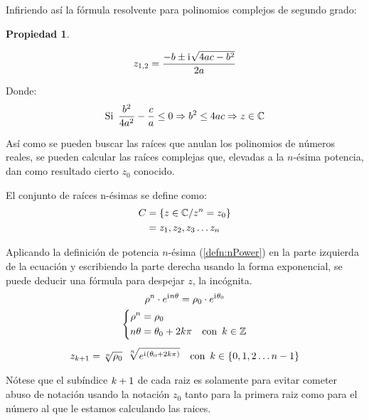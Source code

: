 \documentclass[a5paper,12pt,twoside]{book}
\newtheorem{prop}{{Propiedad}}[chapter]
\begin{document}
Infiriendo así la fórmula resolvente para polinomios complejos de segundo grado:

\begin{mdframed}[style=MyFrame1]
    \begin{prop}
    \end{prop}
    \begin{equation*}
        z_{1,2} = \frac{-b \pm \mathrm{i}\mkern1mu \sqrt{4ac-b^2}}{2a}
    \end{equation*}
\end{mdframed}

Donde:
\begin{equation*}
    \textrm{Si} \enspace \frac{b^2}{4a^2} - \frac{c}{a} \leq 0 \Rightarrow b^2 \leq 4ac \Rightarrow z \in \mathbb{C}
\end{equation*}

Así como se pueden buscar las raíces que anulan los polinomios de números reales, se pueden calcular las raíces complejas que, elevadas a la $n$-ésima potencia, dan como resultado cierto $z_0$ conocido.

El conjunto de raíces n-ésimas se define como:
\begin{align*}
    C &= { \left\{ {z \in \mathbb{C} / z^n=z_0} \right\} }
    \\
    &= z_1,z_2,z_3 \ldots z_n
\end{align*}

Aplicando la definición de potencia $n$-ésima (\ref{defn:nPower}) en la parte izquierda de la ecuación y escribiendo la parte derecha usando la forma exponencial, se puede deducir una fórmula para despejar $z$, la incógnita.
\begin{gather*}
    \rho^n \cdot e^{\mathrm{i}\mkern1mu n \theta} = \rho_0 \cdot e^{\mathrm{i}\mkern1mu \theta_0}
    \\
    \left\{
    \begin{aligned}
        \rho^n &= \rho_0
        \\
        n \theta &= \theta_0 + 2k \pi \quad \textrm{con} \enspace k \in \mathbb{Z}
    \end{aligned}
    \right.
    \\[1ex]
    z_{k+1} = \sqrt[n]{\rho_0} \enspace \sqrt[n]{e^{\mathrm{i}\mkern1mu (\theta_0 + 2 k \pi)}} \quad \textrm{con} \enspace k \in \{0,1,2 \ldots n-1\}
\end{gather*}

Nótese que el subíndice $k+1$ de cada raiz es solamente para evitar cometer abuso de notación usando la notación $z_0$ tanto para la primera raiz como para el número al que le estamos calculando las raices.
\end{document}
